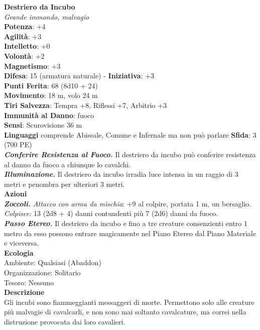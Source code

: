 \begin{multicols}{2}
\medskip\textbf{Destriero da Incubo}\\
\emph{Grande immondo, malvagio}\\
\textbf{Potenza}: +4\\
\textbf{Agilità}: +3\\
\textbf{Intelletto}: +0\\
\textbf{Volontà}: +2\\
\textbf{Magnetismo}: +3\\
\textbf{Difesa}: 15 (armatura naturale) - \textbf{Iniziativa}: +3\\
\textbf{Punti Ferita}: 68 (8d10 + 24)\\
\textbf{Movimento}: 18 m, volo 24 m\\
\textbf{Tiri Salvezza}: Tempra +8, Riflessi +7, Arbitrio +3\\
\textbf{Immunità al Danno}: fuoco\\
\textbf{Sensi}: Scurovisione 36 m\\
\textbf{Linguaggi} comprende Abissale, Comune e Infernale ma non può parlare
\textbf{Sfida}: 3 (700 PE)\smallskip\\
\emph{\textbf{Conferire Resistenza al Fuoco.}} Il destriero da incubo può conferire resistenza al danno da fuoco a chiunque lo cavalchi.\\
\emph{\textbf{Illuminazione.}} Il destriero da incubo irradia luce intensa in un raggio di 3 metri e penombra per ulteriori 3 metri.\\
\smallskip\textbf{Azioni}\\
\emph{\textbf{Zoccoli.} Attacco con arma da mischia}: +9 al colpire, portata 1 m, un bersaglio.\\
\emph{Colpisce:} 13 (2d8 + 4) danni contundenti più 7 (2d6) danni da fuoco.\\
\emph{\textbf{Passo Etereo.}} Il destriero da incubo e fino a tre creature consenzienti entro 1 metro da esso possono entrare magicamente nel Piano Etereo dal Piano Materiale e viceversa.\\
\textbf{Ecologia}\\
Ambiente: Qualsiasi (Abaddon)\\
Organizzazione: Solitario\\
Tesoro: Nessuno\\
\textbf{Descrizione}\\
Gli incubi sono fiammeggianti messaggeri di morte. Permettono solo alle creature più malvagie di cavalcarli, e non sono mai soltanto cavalcature, ma correi nella distruzione provocata dai loro cavalieri.\\


\end{multicols}
